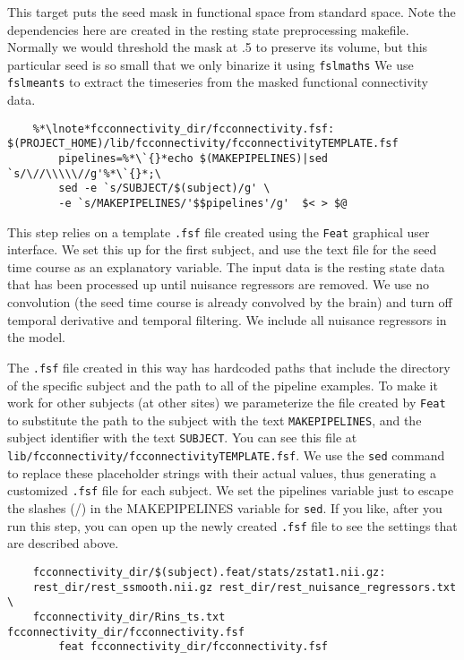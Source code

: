 This target puts the seed mask in functional space from
standard space. Note the dependencies here are created in the resting
state preprocessing makefile. Normally we would threshold the mask at
.5 to preserve its volume, but this particular seed is so small that
we only binarize it using \texttt{fslmaths}
 We use \texttt{fslmeants} to extract the timeseries from the
masked functional connectivity data.

\begin{lstlisting}
	%*\lnote*fcconnectivity_dir/fcconnectivity.fsf: $(PROJECT_HOME)/lib/fcconnectivity/fcconnectivityTEMPLATE.fsf
		pipelines=%*\`{}*echo $(MAKEPIPELINES)|sed `s/\//\\\\\//g'%*\`{}*;\
		sed -e `s/SUBJECT/$(subject)/g' \
		-e `s/MAKEPIPELINES/'$$pipelines'/g'  $< > $@
\end{lstlisting}
This step relies on a template \texttt{.fsf} file created using the
\texttt{Feat} graphical user interface. We set this up for the first
subject, and use the text file for the seed time course as an
explanatory variable. The input data is the resting state data that
has been processed up until nuisance regressors are removed. 
We use no convolution (the seed time course is
already convolved by the brain) and turn off temporal derivative and
temporal filtering. We include all nuisance regressors in the model. 

The \texttt{.fsf} file created
in this way has hardcoded paths that include the directory of the
specific subject and the path to all of the pipeline examples. To make
it work for other subjects (at other sites) we parameterize the file
created by \texttt{Feat} to substitute the path to the subject with
the text \texttt{MAKEPIPELINES}, and the subject identifier with the
text \texttt{SUBJECT}. You can see this file at
\texttt{lib/fcconnectivity/fcconnectivityTEMPLATE.fsf}. We use the
\texttt{sed} command to replace these placeholder strings with their
actual values, thus generating a customized \texttt{.fsf} file for
each subject. We set the pipelines variable just to escape the slashes
(/) in the MAKEPIPELINES variable for \texttt{sed}.
If you like, after you run this step, you can open up the newly
created \texttt{.fsf} file to see the settings that are described above.
\begin{lstlisting}		
	fcconnectivity_dir/$(subject).feat/stats/zstat1.nii.gz: 
	rest_dir/rest_ssmooth.nii.gz rest_dir/rest_nuisance_regressors.txt \
	fcconnectivity_dir/Rins_ts.txt fcconnectivity_dir/fcconnectivity.fsf 
		feat fcconnectivity_dir/fcconnectivity.fsf 
\end{lstlisting}

